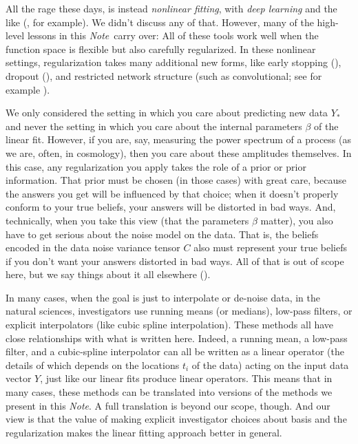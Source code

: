 \documentclass[12pt,letterpaper]{article}
\newcommand{\documentname}{\textsl{Note}}
\begin{document}
All the rage these days, is instead \emph{nonlinear fitting}, with \emph{deep learning} and the like (\citealt{deep}, for example).
We didn't discuss any of that.
However, many of the high-level lessons in this \documentname\ carry over:
All of these tools work well when the function space is flexible but also carefully regularized.
In these nonlinear settings, regularization takes many additional new forms, like early stopping (\citealt{earlystop}), dropout (\citealt{dropout}), and restricted network structure (such as convolutional; see for example \citealt{bishop}).

We only considered the setting in which you care about predicting new data $Y_\ast$ and never the setting in which you care about the internal parameters $\beta$ of the linear fit.
However, if you are, say, measuring the power spectrum of a process (as we are, often, in cosmology), then you care about these amplitudes themselves.
In this case, any regularization you apply takes the role of a prior or prior information.
That prior must be chosen (in those cases) with great care, because the answers you get will be influenced by that choice; when it doesn't properly conform to your true beliefs, your answers will be distorted in bad ways.
And, technically, when you take this view (that the parameters $\beta$ matter), you also have to get serious about the noise model on the data.
That is, the beliefs encoded in the data noise variance tensor $C$ also must represent your true beliefs if you don't want your answers distorted in bad ways.
All of that is out of scope here, but we say things about it all elsewhere (\citealt{fitting}).

In many cases, when the goal is just to interpolate or de-noise data, in the natural sciences, investigators use running means (or medians), low-pass filters, or explicit interpolators (like cubic spline interpolation).
These methods all have close relationships with what is written here.
Indeed, a running mean, a low-pass filter, and a cubic-spline interpolator can all be written as a linear operator (the details of which depends on the locations $t_i$ of the data) acting on the input data vector $Y$, just like our linear fits produce linear operators.
This means that in many cases, these methods can be translated into versions of the methods we present in this \documentname.
A full translation is beyond our scope, though.
And our view is that the value of making explicit investigator choices about basis and the regularization makes the linear fitting approach better in general.
\end{document}
